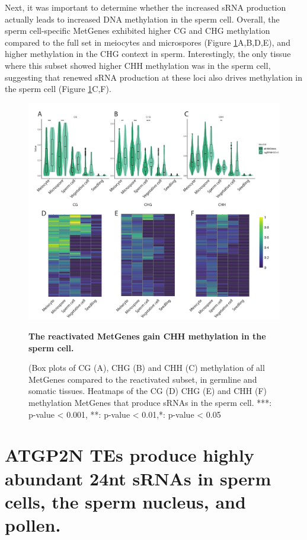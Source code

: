 Next, it was important to determine whether the increased sRNA production actually leads to increased DNA methylation in the sperm cell. Overall, the sperm cell-specific MetGenes exhibited higher CG and CHG methylation compared to the full set in meiocytes and microspores (Figure \ref{fig:boxplot_MetGene_methylation}A,B,D,E), and higher methylation in the CHG context in sperm. Interestingly, the only tissue where this subset showed higher CHH methylation was in the sperm cell, suggesting that renewed sRNA production at these loci also drives methylation in the sperm cell (Figure \ref{fig:boxplot_MetGene_methylation}C,F).

\begin{figure}[htbp!] 
\centering    
    \includegraphics[width=1\textwidth]{Chapter2/Figs/Figure12_Reactivated_MetGenes_methylation.pdf}
\caption{\textbf{The reactivated MetGenes gain CHH methylation in the sperm cell.}}
\label{fig:boxplot_MetGene_methylation}
\captionsetup{font=small}
    \caption*{(Box plots of CG (A), CHG (B) and CHH (C) methylation of all MetGenes compared to the reactivated subset, in germline and somatic tissues. Heatmaps of the CG (D) CHG (E) and CHH (F) methylation MetGenes that produce sRNAs in the sperm cell. ***: p-value < 0.001, **: p-value < 0.01,*: p-value < 0.05}
\end{figure}

\section{ATGP2N TEs produce highly abundant 24nt sRNAs in sperm cells, the sperm nucleus, and pollen.}

